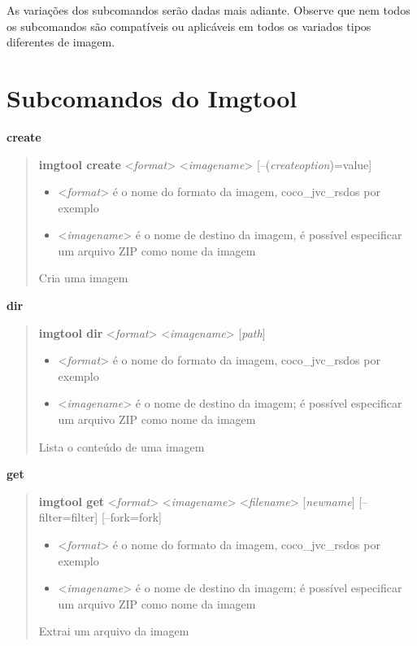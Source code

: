 \documentclass[letterpaper,10pt,brazil]{sphinxmanual}
\begin{document}
As variações dos subcomandos serão dadas mais adiante. Observe que nem
todos os subcomandos são compatíveis ou aplicáveis em todos os
variados tipos diferentes de imagem.


\section{Subcomandos do Imgtool}
\label{tools/imgtool:subcomandos-do-imgtool}
\textbf{create}
\begin{quote}

\textbf{imgtool create} \textless{}\emph{format}\textgreater{} \textless{}\emph{imagename}\textgreater{} {[}--(\emph{createoption})=value{]}
\begin{itemize}
\item {} 
\textless{}\emph{format}\textgreater{} é o nome do formato da imagem, coco\_jvc\_rsdos por exemplo

\item {} 
\textless{}\emph{imagename}\textgreater{} é o nome de destino da imagem, é possível especificar um arquivo ZIP como nome da imagem

\end{itemize}

Cria uma imagem
\end{quote}

\textbf{dir}
\begin{quote}

\textbf{imgtool dir} \textless{}\emph{format}\textgreater{} \textless{}\emph{imagename}\textgreater{} {[}\emph{path}{]}
\begin{itemize}
\item {} 
\textless{}\emph{format}\textgreater{} é o nome do formato da imagem, coco\_jvc\_rsdos por exemplo

\item {} 
\textless{}\emph{imagename}\textgreater{} é o nome de destino da imagem; é possível especificar um arquivo ZIP como nome da imagem

\end{itemize}

Lista o conteúdo de uma imagem
\end{quote}

\textbf{get}
\begin{quote}

\textbf{imgtool get} \textless{}\emph{format}\textgreater{} \textless{}\emph{imagename}\textgreater{} \textless{}\emph{filename}\textgreater{} {[}\emph{newname}{]} {[}--filter=filter{]} {[}--fork=fork{]}
\begin{itemize}
\item {} 
\textless{}\emph{format}\textgreater{} é o nome do formato da imagem, coco\_jvc\_rsdos por exemplo

\item {} 
\textless{}\emph{imagename}\textgreater{} é o nome de destino da imagem; é possível especificar um arquivo ZIP como nome da imagem

\end{itemize}

Extrai um arquivo da imagem
\end{quote}
\end{document}
